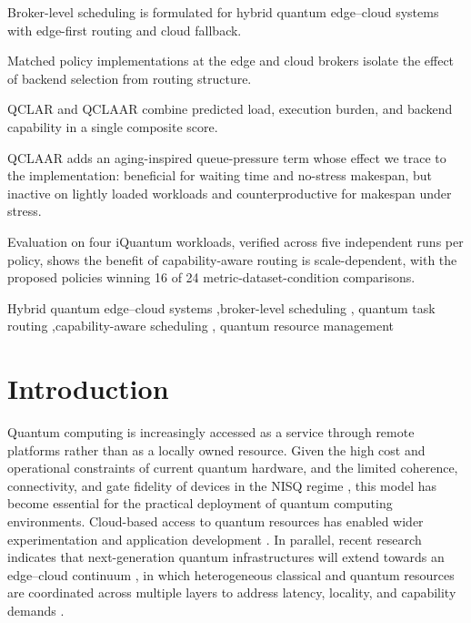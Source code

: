 \documentclass[preprint,12pt]{elsarticle}
\begin{document}
\begin{frontmatter}
\begin{highlights}
\item Broker-level scheduling is formulated for hybrid quantum edge--cloud
      systems with edge-first routing and cloud fallback.
\item Matched policy implementations at the edge and cloud brokers isolate the
      effect of backend selection from routing structure.
\item QCLAR and QCLAAR combine predicted load, execution burden, and backend
      capability in a single composite score.
\item QCLAAR adds an aging-inspired queue-pressure term whose effect we trace
      to the implementation: beneficial for waiting time and no-stress
      makespan, but inactive on lightly loaded workloads and counterproductive
      for makespan under stress.
\item Evaluation on four iQuantum workloads, verified across five independent
      runs per policy, shows the benefit of capability-aware routing is
      scale-dependent, with the proposed policies winning 16 of 24
      metric-dataset-condition comparisons.
\end{highlights}

\begin{keyword}
Hybrid quantum edge--cloud systems \sep broker-level scheduling \sep
quantum task routing \sep capability-aware scheduling \sep
quantum resource management
\end{keyword}

\end{frontmatter}

\section{Introduction}
Quantum computing is increasingly accessed as a service through remote
platforms rather than as a locally owned resource. Given the high cost and
operational constraints of current quantum hardware, and the limited coherence,
connectivity, and gate fidelity of devices in the NISQ regime
\cite{preskill2018, nielsen2010}, this model has become essential for the
practical deployment of quantum computing environments.
Cloud-based access to quantum resources has enabled wider experimentation and
application development \cite{cross2019, leymann2020}. In parallel, recent
research indicates that next-generation quantum infrastructures will extend
towards an edge--cloud continuum \cite{satya2017, shi2016}, in which
heterogeneous classical and quantum resources are coordinated across multiple
layers to address latency, locality, and capability demands
\cite{furutanpey2023, mastroianni2023}.
\end{document}
